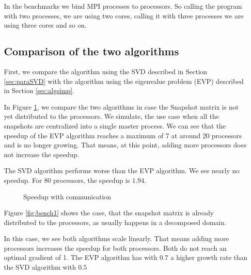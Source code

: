 In the benchmarks we bind MPI processes to processors.
So calling the program with two processes, we are using two cores, calling it with three processes we are using three cores and so on.

%    

\newpage
\subsection{Comparison of the two algorithms}
\label{sec:comparison}
First, we compare 
the algorithm using the SVD described in Section \ref{sec:paraSVD}
with 
the algorithm using the eigenvalue problem (EVP) described in Section \ref{sec:algsimp}.

In Figure \ref{fig:bench1comm}, we compare the two algorithms in case the Snapshot matrix is not yet distributed to the processors.
We simulate, the use case when all the snapshots are centralized into a single master process. 
We can see that the speedup of the EVP algorithm reaches a maximum of $7$ at around 20 processors and is no longer growing.
That means, at this point, adding more processors does not increase the speedup.

The SVD algorithm performs worse than the EVP algorithm. We see nearly no speedup. For 80 processors, the speedup is $1.94$.

\begin{figure}[H]
	\centering
	
	\caption{Speedup with communication}
	\label{fig:bench1comm}
\end{figure}
\newpage

Figure \ref{fig:bench1} shows the case, that the snapshot matrix is already distributed to the processors, as usually happens in a decomposed domain.

In this case, we see both algorithms scale linearly. That means adding more processors increases the speedup for both processors.
Both do not reach an optimal gradient of 1. The EVP algorithm has with $0.7$ a higher growth rate than the SVD  algorithm with $0.5$



